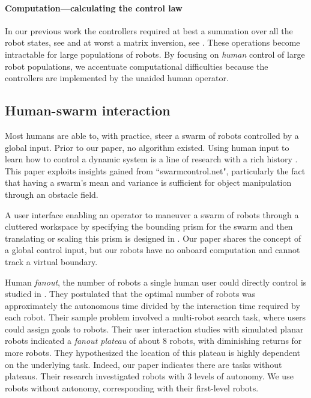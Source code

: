 \paragraph{Computation---calculating the control law}
In our previous work the controllers required at best a summation over all the robot states, see \cite{Becker2012k} and at worst a matrix inversion, see \cite{Becker2012}. 
These operations become intractable for large populations of robots. By focusing on \emph{human} control of large robot populations, we accentuate computational difficulties because the controllers are implemented by the unaided human operator. %


 \subsection{Human-swarm interaction}
 
  Most humans are able to, with practice, steer a swarm of robots controlled by a global input. Prior to our paper, no algorithm existed. Using human input to learn how to control a dynamic system is a line of research with a rich history \cite{argall2009, abbeel2010}. This paper exploits insights gained from ``swarmcontrol.net", particularly the fact that having a swarm's mean and variance is sufficient for object manipulation through an obstacle field.
  
 A user interface enabling an operator to maneuver a swarm of robots through a cluttered workspace by specifying the bounding prism for the swarm and then translating or scaling this prism is designed in \cite{ayanian2014controlling}. Our paper shares the concept of a global control input, but our robots have no onboard computation and cannot track a virtual boundary.
 
Human \emph{fanout}, the number of robots a single human user could directly control is studied in \cite{Jr2004}.  %
They postulated that the optimal number of robots was approximately  the autonomous time  divided by the interaction time required by each robot.  Their sample problem involved a multi-robot search task, where users could assign goals to robots.  Their user interaction studies with simulated planar robots  indicated a \emph{fanout plateau} of about 8 robots, with diminishing returns for more robots.   They hypothesized the location of this plateau is highly dependent on the underlying task.  Indeed, our paper indicates there are tasks without plateaus. %
Their research investigated robots with 3 levels of autonomy.  We use robots without autonomy, corresponding with their first-level robots.

